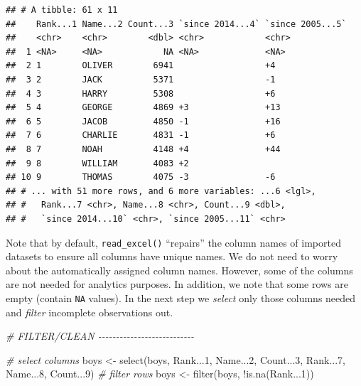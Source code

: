 \documentclass[
  12pt,
]{style/krantz}
\newenvironment{Shaded}{\begin{snugshade}}{\end{snugshade}}
\newcommand{\CommentTok}[1]{\textcolor[rgb]{0.56,0.35,0.01}{\textit{#1}}}
\newcommand{\DecValTok}[1]{\textcolor[rgb]{0.00,0.00,0.81}{#1}}
\newcommand{\FunctionTok}[1]{\textcolor[rgb]{0.00,0.00,0.00}{#1}}
\newcommand{\NormalTok}[1]{#1}
\newcommand{\OtherTok}[1]{\textcolor[rgb]{0.56,0.35,0.01}{#1}}
\newcommand{\SpecialCharTok}[1]{\textcolor[rgb]{0.00,0.00,0.00}{#1}}
\begin{document}
\begin{verbatim}
## # A tibble: 61 x 11
##    Rank...1 Name...2 Count...3 `since 2014...4` `since 2005...5`
##    <chr>    <chr>        <dbl> <chr>            <chr>           
##  1 <NA>     <NA>            NA <NA>             <NA>            
##  2 1        OLIVER        6941 ­                 +4              
##  3 2        JACK          5371 ­                 -1              
##  4 3        HARRY         5308 ­                 +6              
##  5 4        GEORGE        4869 +3               +13             
##  6 5        JACOB         4850 -1               +16             
##  7 6        CHARLIE       4831 -1               +6              
##  8 7        NOAH          4148 +4               +44             
##  9 8        WILLIAM       4083 +2               ­                
## 10 9        THOMAS        4075 -3               -6              
## # ... with 51 more rows, and 6 more variables: ...6 <lgl>,
## #   Rank...7 <chr>, Name...8 <chr>, Count...9 <dbl>,
## #   `since 2014...10` <chr>, `since 2005...11` <chr>
\end{verbatim}

Note that by default, \texttt{read\_excel()} ``repairs'' the column names of imported datasets to ensure all columns have unique names. We do not need to worry about the automatically assigned column names. However, some of the columns are not needed for analytics purposes. In addition, we note that some rows are empty (contain \texttt{NA} values). In the next step we \emph{select} only those columns needed and \emph{filter} incomplete observations out.

\begin{Shaded}
\begin{Highlighting}[]
\CommentTok{\# FILTER/CLEAN {-}{-}{-}{-}{-}{-}{-}{-}{-}{-}{-}{-}{-}{-}{-}{-}{-}{-}{-}{-}{-}{-}{-}{-}{-}{-}{-}}

\CommentTok{\# select columns}
\NormalTok{boys }\OtherTok{\textless{}{-}} \FunctionTok{select}\NormalTok{(boys, Rank...}\DecValTok{1}\NormalTok{, Name...}\DecValTok{2}\NormalTok{, Count...}\DecValTok{3}\NormalTok{, Rank...}\DecValTok{7}\NormalTok{, Name...}\DecValTok{8}\NormalTok{, Count...}\DecValTok{9}\NormalTok{)}
\CommentTok{\# filter rows}
\NormalTok{boys }\OtherTok{\textless{}{-}}  \FunctionTok{filter}\NormalTok{(boys, }\SpecialCharTok{!}\FunctionTok{is.na}\NormalTok{(Rank...}\DecValTok{1}\NormalTok{))}
\end{Highlighting}
\end{Shaded}
\end{document}
